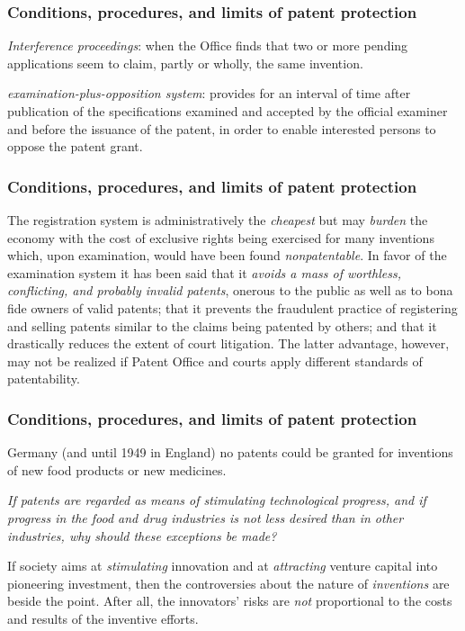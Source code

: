 \begin{frame}
\frametitle{Conditions, procedures, and limits of patent protection}
\textit{Interference proceedings}: when the Office finds that two or more pending applications seem to claim, partly or wholly, the same invention.

\textit{examination-plus-opposition system}: provides for an interval of time after publication of the specifications examined and accepted by the official examiner and before the issuance of the patent, in order to enable interested persons to oppose the patent grant.
\end{frame}

\begin{frame}
\frametitle{Conditions, procedures, and limits of patent protection}
The registration system is administratively the \textit{cheapest} but may \textit{burden} the economy with the cost of exclusive rights being exercised for many inventions which, upon examination, would have been found \textit{nonpatentable}. In favor of the examination system it has been said that it \textit{avoids a mass of worthless, conflicting, and probably invalid patents}, onerous to the public as well as to bona fide owners of valid patents; that it prevents the fraudulent practice of registering and selling patents similar to the claims being patented by others; and that it drastically reduces the extent of court litigation. The latter advantage, however, may not be realized if Patent Office and courts apply different standards of patentability.
\end{frame}

\begin{frame}
\frametitle{Conditions, procedures, and limits of patent protection}
Germany (and until 1949 in England) no patents could be granted for inventions of new food products or new medicines.

\textit{If patents are regarded as means of stimulating technological progress, and if progress in the food and drug industries is not less desired than in other industries, why should these exceptions be made?}

If society aims at \textit{stimulating} innovation and at \textit{attracting} venture capital into pioneering investment, then the controversies about the nature of \textit{inventions} are beside the point. After all, the innovators’ risks are \textit{not} proportional to the costs and results of the inventive efforts.
\end{frame}


